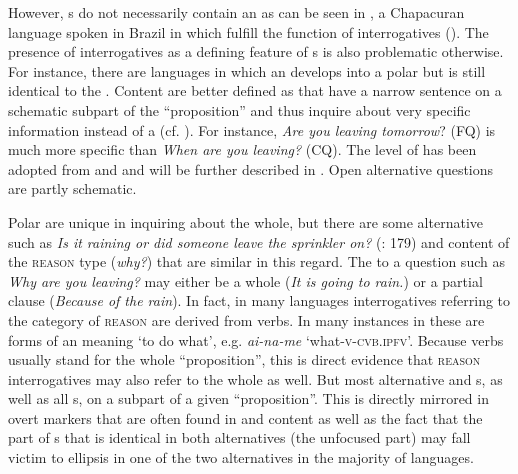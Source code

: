However, s do not necessarily contain an  as can be seen in , a Chapacuran language spoken in Brazil in which  fulfill the function of interrogatives (\citealt{EverettKern1997}). The presence of interrogatives as a defining feature of s is also problematic otherwise. For instance, there are languages in which an  develops into a polar  but is still identical to the . Content  are better defined as  that have a narrow sentence  on a schematic subpart of the “proposition” and thus inquire about very specific information instead of a  (cf. \citealt{Dixon2012}). For instance, \textit{Are you leaving tomorrow}? (FQ) is much more specific than \textit{When are you leaving?} (CQ). The level of  has been adopted from \citet[238]{Arnheim1969} and \citet[19]{Langacker2008} and will be further described in . Open alternative questions are partly schematic.

Polar  are unique in inquiring about the whole, but there are some alternative  such as \textit{Is it raining or did someone leave the sprinkler on?} (\citealt{SadockZwicky1985}: 179) and content  of the \textsc{reason} type (\textit{why?}) that are similar in this regard. The  to a question such as \textit{Why are you leaving?} may either be a whole (\textit{It is going to rain.}) or a partial clause (\textit{Because of the rain}). In fact, in many languages interrogatives referring to the category of \textsc{reason} are derived from  verbs. In many instances in  these are  forms of an  meaning ‘to do what’, e.g.  \textit{ai-na-me} ‘what-\textsc{v}-\textsc{cvb.ipfv}’. Because verbs usually stand for the whole “proposition”, this is direct evidence that \textsc{reason} interrogatives may also refer to the whole as well. But most alternative  and s, as well as all s,  on a subpart of a given “proposition”. This is directly mirrored in overt  markers that are often found in  and content  as well as the fact that the part of s that is identical in both alternatives (the unfocused part) may fall victim to ellipsis in one of the two alternatives in the majority of languages.

